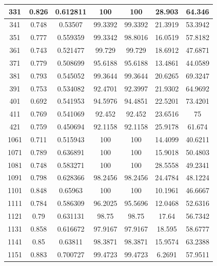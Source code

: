 \begin{appendices}
\begin{table}
\begin{tabular}{ |c|c|c|c|c|c|c| }
\hline
331 &  0.826 &  0.612811 &  100 &  100 &  28.903 &  64.346 \\
\hline
341 &  0.748 &  0.53507 &  99.3392 &  99.3392 &  21.3919 &  53.3942 \\
\hline
351 &  0.777 &  0.559359 &  99.3342 &  98.8016 &  16.0519 &  57.8182 \\
\hline
361 &  0.743 &  0.521477 &  99.729 &  99.729 &  18.6912 &  47.6871 \\
\hline
371 &  0.779 &  0.508699 &  95.6188 &  95.6188 &  13.4861 &  44.0589 \\
\hline
381 &  0.793 &  0.545052 &  99.3644 &  99.3644 &  20.6265 &  69.3247 \\
\hline
391 &  0.753 &  0.534082 &  92.4701 &  92.3997 &  21.9302 &  64.9692 \\
\hline
401 &  0.692 &  0.541953 &  94.5976 &  94.4851 &  22.5201 &  73.4201 \\
\hline
411 &  0.769 &  0.541069 &  92.452 &  92.452 &  23.6516 &  75 \\
\hline
421 &  0.759 &  0.450694 &  92.1158 &  92.1158 &  25.9178 &  61.674 \\
\hline
1061 &  0.711 &  0.515943 &  100 &  100 &  14.4099 &  40.6211 \\
\hline
1071 &  0.789 &  0.636891 &  100 &  100 &  15.9018 &  50.4803 \\
\hline
1081 &  0.748 &  0.583271 &  100 &  100 &  28.5558 &  49.2341 \\
\hline
1091 &  0.798 &  0.628366 &  98.2456 &  98.2456 &  24.4784 &  48.1224 \\
\hline
1101 &  0.848 &  0.65963 &  100 &  100 &  10.1961 &  46.6667 \\
\hline
1111 &  0.784 &  0.586309 &  96.2025 &  95.5696 &  12.0468 &  52.6316 \\
\hline
1121 &  0.79 &  0.631131 &  98.75 &  98.75 &  17.64 &  56.7342 \\
\hline
1131 &  0.858 &  0.616672 &  97.9167 &  97.9167 &  18.595 &  58.6777 \\
\hline
1141 &  0.85 &  0.63811 &  98.3871 &  98.3871 &  15.9574 &  63.2388 \\
\hline
1151 &  0.883 &  0.700727 &  99.4723 &  99.4723 &  6.2691 &  57.9511 \\
\hline
\end{tabular}

\end{table}


\end{appendices}
